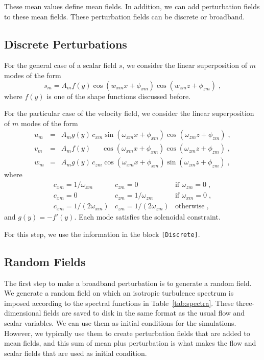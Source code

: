 These mean values define mean fields. In addition, we can add perturbation fields to these mean fields. These perturbation fields can be discrete or broadband.

\subsection{Discrete Perturbations}

For the general case of a scalar field $s$, we consider the linear superposition of $m$ modes of the form
\begin{equation}
    s_m = A_mf(y) \cos(w_{xm}x+\phi_{xm})\cos(w_{zm}z+\phi_{zm})\;, 
\end{equation}
where $f(y)$ is one of the shape functions discussed before.

For the particular case of the velocity field, we consider the linear superposition of $m$ modes of the form
\begin{eqnarray}
    u_m &= &A_mg(y)\,c_{xm}         \sin(\omega_{xm}x+\phi_{xm})\cos(\omega_{zm}z+\phi_{zm})\;, \\
    v_m &= &A_mf(y)\phantom{c_{xm}} \cos(\omega_{xm}x+\phi_{xm})\cos(\omega_{zm}z+\phi_{zm})\;, \\
    w_m &= &A_mg(y)\,c_{zm}         \cos(\omega_{xm}x+\phi_{xm})\sin(\omega_{zm}z+\phi_{zm})\;,
\end{eqnarray}
where
\begin{equation*}
    \begin{array}{lll}
        c_{xm}=1/\omega_{xm}    & c_{zm}=0            & \text{if } \omega_{zm}=0\;, \\
        c_{xm}=0           & c_{zm}=1/\omega_{zm}     & \text{if } \omega_{xm}=0\;, \\
        c_{xm}=1/(2\omega_{xm}) & c_{zm}=1/(2\omega_{zm})  & \text{otherwise}\;,
    \end{array}
\end{equation*}
and $g(y)=-f'(y)$. Each mode satisfies the solenoidal constraint.

For this step, we use the information in the block \texttt{[Discrete]}.

\subsection{Random Fields}

The first step to make a broadband perturbation is to generate a random field. We generate a random field on which an isotropic turbulence spectrum  is imposed according to the spectral functions in Table~\ref{tab:spectra}. These three-dimensional fields are saved to disk in the same format as the usual flow and scalar variables. We can use them as initial conditions for the simulations. However, we typically use them to create perturbation fields that are added to mean fields, and this sum of mean plus perturbation is what makes the flow and scalar fields that are used as initial condition.

